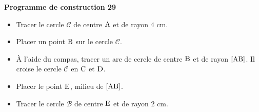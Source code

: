 \documentclass[exercice,a4]{thedocument}%
\begin{document}
%
\noindent\textbf{Programme de construction 29}\par\smallskip\noindent
\begin{itemize}
    \item Tracer le cercle $\mathcal{C}$ de centre $\text{A}$ et de
    rayon $4\text{ cm}$.
    \item Placer un point $\text{B}$ sur le cercle $\mathcal{C}$.
    \item À l'aide du compas, tracer un arc de cercle de centre
    $\text{B}$ et de rayon $[\text{AB}]$. Il croise le cercle
    $\mathcal{C}$ en $\text{C}$ et $\text{D}$.
    \item Placer le point $\text{E}$, milieu de $[\text{AB}]$.
    \item Tracer le cercle $\mathcal{B}$ de centre $\text{E}$ et de
    rayon $2\text{ cm}$.
\end{itemize}
\end{document}
